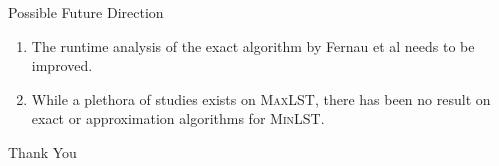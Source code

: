 \documentclass{beamer}
\begin{document}
\begin{frame}{Possible Future Direction}
    
\begin{enumerate}
    \item The runtime analysis of the exact algorithm by Fernau et al needs to be improved. \pause 
    \item While a plethora of studies exists on \textsc{MaxLST}, there has been no result on exact or approximation algorithms for \textsc{MinLST}.
\end{enumerate}
\end{frame}

\begin{frame}{}
    \centering
    {\Huge Thank You}
\end{frame}
\end{document}
